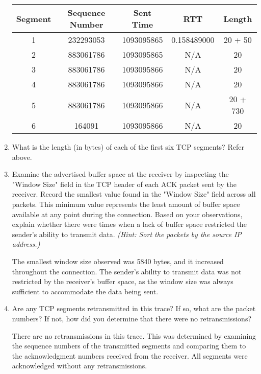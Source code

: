 \documentclass[12pt]{article}
\begin{document}
\begin{enumerate}[label=Q\arabic*:, resume]
          \begin{tabular}{|c|c|c|c|c|}
              \hline
              Segment & Sequence Number & Sent Time  & RTT         & Length   \\
              \hline
              1       & 232293053       & 1093095865 & 0.158489000 & 20 + 50  \\
              2       & 883061786       & 1093095865 & N/A         & 20       \\
              3       & 883061786       & 1093095866 & N/A         & 20       \\
              4       & 883061786       & 1093095866 & N/A         & 20       \\
              5       & 883061786       & 1093095866 & N/A         & 20 + 730 \\
              6       & 164091          & 1093095866 & N/A         & 20       \\
              \hline
          \end{tabular}

    \item What is the length (in bytes) of each of the first six TCP segments?
          Refer above.

    \item Examine the advertised buffer space at the receiver by inspecting the
          "Window Size" field in the TCP header of each ACK packet sent by the
          receiver. Record the smallest value found in the "Window Size" field across
          all packets. This minimum value represents the least amount of buffer space
          available at any point during the connection. Based on your observations,
          explain whether there were times when a lack of buffer space restricted the
          sender’s ability to transmit data. \textit{(Hint: Sort the packets by the
              source IP address.)}

          The smallest window size observed was 5840 bytes, and it increased
          throughout the connection. The sender's ability to transmit data was not
          restricted by the receiver's buffer space, as the window size was always
          sufficient to accommodate the data being sent.

    \item Are any TCP segments retransmitted in this trace? If so, what are the
          packet numbers? If not, how did you determine that there were no
          retransmissions?

          There are no retransmissions in this trace. This was determined by
          examining the sequence numbers of the transmitted segments and
          comparing them to the acknowledgment numbers received from the
          receiver. All segments were acknowledged without any retransmissions.


\end{enumerate}
\end{document}
